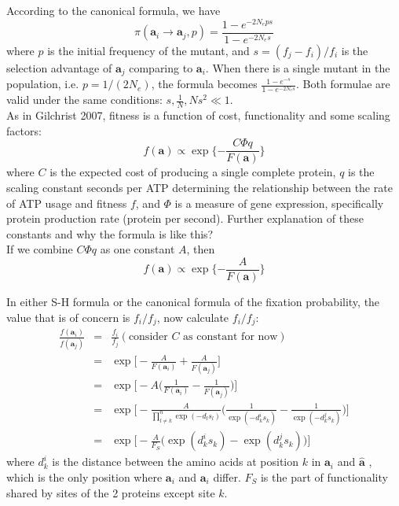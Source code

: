\documentclass[13pt]{article}
\begin{document}
According to the canonical formula, we have
\begin{equation}
\pi(\mathbf{a}_i \rightarrow \mathbf{a}_j,p) = \frac{1-e^{-2N_e ps}}{1-e^{-2N_es}}
\label{eq:fixcanonical}
\end{equation}
where $p$ is the initial frequency of the mutant, and $s=(f_j-f_i)/f_i$ is the selection advantage of $\mathbf{a}_j$ comparing to $\mathbf{a}_i$.
When there is a single mutant in the population, i.e. $p=1/(2N_e)$, the formula becomes
$\frac{1-e^{-s}}{1-e^{-2N_es}}$. Both formulae are valid under the same conditions: $s, \frac{1}{N}, Ns^2 \ll 1$.\\


 
As in Gilchrist 2007, fitness is a function of cost, functionality and some scaling factors:
\[f(\mathbf{a}) \propto \exp\{-\frac{C\Phi q}{F(\mathbf{a})}\}\]
where $C$ is the expected cost of producing a single complete protein, $q$ is the scaling constant seconds per ATP determining the relationship between the rate of ATP usage and fitness $f$, and $\Phi$ is a measure of gene expression, specifically protein production rate (protein per second). {\color{blue} Further explanation of these constants and why the formula is like this?}\\

If we combine $C\Phi q$ as one constant $A$, then 
\[ f(\mathbf{a}) \propto \exp\{-\frac{A}{F(\mathbf{a})}\} \]

In either S-H formula or the canonical formula of the fixation probability, the value that is of concern is $f_i/f_j$, now calculate $f_i/f_j$:
\begin{eqnarray}
\frac{f(\mathbf{a}_i)}{f(\mathbf{a}_j)} & = & \frac{f_i}{f_j} (\text{consider $C$ as constant for now}) \nonumber\\
& = & \exp\Big[-\frac{A}{F(\mathbf{a}_i)} + \frac{A}{F(\mathbf{a}_j )}\Big] \nonumber\\
& = & \exp \Big[-A\Big( \frac{1}{F(\mathbf{a}_i )} - \frac{1}{F(\mathbf{a}_j )}\Big)\Big] \nonumber\\
& = & \exp \Big[-\frac{A}{\prod_{l\neq k}^n \exp(-d_l s_l)}\Big(\frac{1}{\exp(-d_k^i s_k)}-\frac{1}{\exp(-d_k^j s_k)}\Big)\Big]\nonumber\\
& = & \exp\Big[ -\frac{A}{F_S}\Big(\exp(d_k^i s_k) - \exp(d_k^j s_k)\Big)\Big]
\label{eq:fitnessratio}
\end{eqnarray}
where $d_k^i$ is the distance between the amino acids at position $k$ in $\mathbf{a}_i$ and $\hat{\mathbf{a}}$ , which is the only position where $\mathbf{a}_i$ and $\mathbf{a}_i$ differ. $F_S$ is the part of functionality shared by sites of the 2 proteins except site $k$. \\
\end{document}
